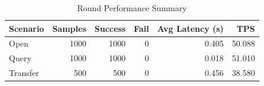 \begin{table}
\caption{Round Performance Summary}
\label{tab:round_perf}
\begin{tabular}{lrrrrr}
\toprule
Scenario & Samples & Success & Fail & Avg Latency (s) & TPS \\
\midrule
Open & 1000 & 1000 & 0 & 0.405 & 50.088 \\
Query & 1000 & 1000 & 0 & 0.018 & 51.010 \\
Transfer & 500 & 500 & 0 & 0.456 & 38.580 \\
\bottomrule
\end{tabular}
\end{table}
